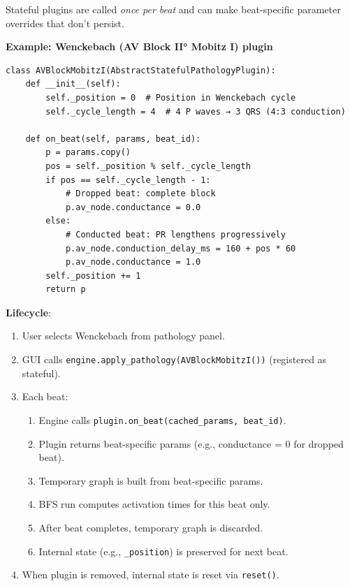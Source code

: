 \documentclass[12pt,oneside,a4paper]{book}
\newcommand{\code}[1]{\texttt{#1}}
\begin{document}
Stateful plugins are called \emph{once per beat} and can make beat-specific parameter overrides that don't persist.

\textbf{Example: Wenckebach (AV Block II° Mobitz I) plugin}

\begin{lstlisting}
class AVBlockMobitzI(AbstractStatefulPathologyPlugin):
    def __init__(self):
        self._position = 0  # Position in Wenckebach cycle
        self._cycle_length = 4  # 4 P waves → 3 QRS (4:3 conduction)
    
    def on_beat(self, params, beat_id):
        p = params.copy()
        pos = self._position % self._cycle_length
        if pos == self._cycle_length - 1:
            # Dropped beat: complete block
            p.av_node.conductance = 0.0
        else:
            # Conducted beat: PR lengthens progressively
            p.av_node.conduction_delay_ms = 160 + pos * 60
            p.av_node.conductance = 1.0
        self._position += 1
        return p
\end{lstlisting}

\textbf{Lifecycle}:

\begin{enumerate}
  \item User selects Wenckebach from pathology panel.
  \item GUI calls \code{engine.apply\_pathology(AVBlockMobitzI())} (registered as stateful).
  \item Each beat:
    \begin{enumerate}
      \item Engine calls \code{plugin.on\_beat(cached\_params, beat\_id)}.
      \item Plugin returns beat-specific params (e.g., conductance = 0 for dropped beat).
      \item Temporary graph is built from beat-specific params.
      \item BFS run computes activation times for this beat only.
      \item After beat completes, temporary graph is discarded.
      \item Internal state (e.g., \code{\_position}) is preserved for next beat.
    \end{enumerate}
  \item When plugin is removed, internal state is reset via \code{reset()}.
\end{enumerate}

\end{document}

